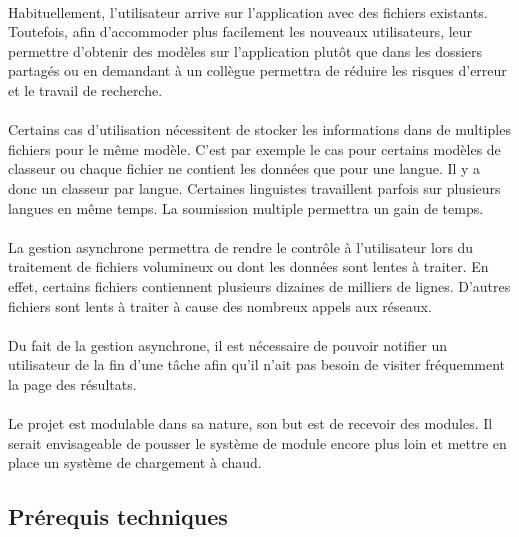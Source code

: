 \paragraph{}
Habituellement, l'utilisateur arrive sur l'application avec des fichiers existants. Toutefois, afin d'accommoder plus facilement les nouveaux utilisateurs, leur permettre d'obtenir des modèles sur l'application plutôt que dans les dossiers partagés ou en demandant à un collègue permettra de réduire les risques d'erreur et le travail de recherche.

\paragraph{}
Certains cas d'utilisation nécessitent de stocker les informations dans de multiples fichiers pour le même modèle.
C'est par exemple le cas pour certains modèles de classeur ou chaque fichier ne contient les données que pour une langue.
Il y a donc un classeur par langue.
Certaines linguistes travaillent parfois sur plusieurs langues en même temps.
La soumission multiple permettra un gain de temps.

\paragraph{}
La gestion asynchrone permettra de rendre le contrôle à l'utilisateur lors du traitement de fichiers volumineux ou dont les données sont lentes à traiter.
En effet, certains fichiers contiennent plusieurs dizaines de milliers de lignes.
D'autres fichiers sont lents à traiter à cause des nombreux appels aux réseaux.

\paragraph{}
Du fait de la gestion asynchrone, il est nécessaire de pouvoir notifier un utilisateur de la fin d'une tâche afin qu'il n'ait pas besoin de visiter fréquemment la page des résultats.

\paragraph{}
Le projet est modulable dans sa nature, son but est de recevoir des modules.
Il serait envisageable de pousser le système de module encore plus loin et mettre en place un système de chargement à chaud.

\subsection{Prérequis techniques}
\label{subsec:nex-version-technical-requirements}

